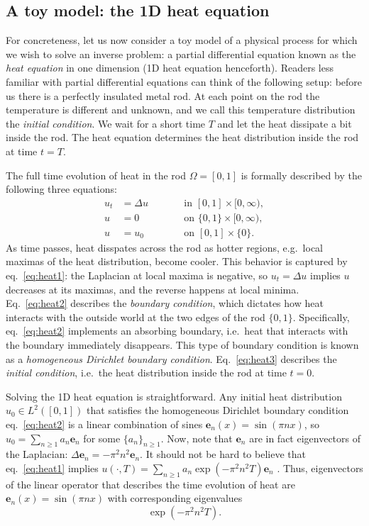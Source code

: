 \documentclass[ba]{imsart}
\newcommand{\ev}{\mathbf{e}} \newcommand{\func}{\mathbf{a}}
\theoremstyle{plain}
\theoremstyle{definition}
\theoremstyle{remark}
\begin{document}
\subsection{A toy model: the 1D heat equation}\label{subsec:toy}
For concreteness, let us now consider a toy model of a physical
process for which we wish to solve an inverse problem: a partial
differential equation known as the \emph{heat equation} in one
dimension (1D heat equation henceforth). Readers less familiar with
partial differential equations can think of the following setup:
before us there is a perfectly insulated metal rod. At each point on
the rod the temperature is different and unknown, and we call this
temperature distribution the \emph{initial condition}. We wait for a
short time $T$ and let the heat dissipate a bit inside the rod. The
heat equation determines the heat distribution inside the rod at time
$t=T$.

The full time evolution of heat in the rod $\Omega=[0,1]$ is formally
described by the following three equations:
\begin{subequations}\begin{alignat}{2}
    u_t &= \Delta u &&\qquad \text{in } [0,1] \times [0,\infty), \label{eq:heat1}\\
    u &= 0 &&\qquad \text{on } \{0, 1\} \times [0,\infty), \label{eq:heat2}\\
    u &= u_0 &&\qquad \text{on }[0,1] \times \{0\}. \label{eq:heat3}
  \end{alignat}
\end{subequations}
As time passes, heat disspates across the rod as hotter regions,
e.g.~local maximas of the heat distribution, become cooler. This
behavior is captured by eq.~\eqref{eq:heat1}: the Laplacian at local
maxima is negative, so $u_t = \Delta u$ implies $u$ decreases at its
maximas, and the reverse happens at local minima. Eq.~\eqref{eq:heat2}
describes the \emph{boundary condition}, which dictates how heat
interacts with the outside world at the two edges of the rod
$\{0,1\}$. Specifically, eq.~\eqref{eq:heat2} implements an absorbing
boundary, i.e.~heat that interacts with the boundary immediately
disappears. This type of boundary condition is known as a
\emph{homogeneous Dirichlet boundary condition}. Eq.~\eqref{eq:heat3}
describes the \emph{initial condition}, i.e.~the heat distribution
inside the rod at time $t=0$.

Solving the 1D heat equation is straightforward. Any initial heat
distribution $u_0\in L^2([0,1])$ that satisfies the homogeneous
Dirichlet boundary condition eq.~\eqref{eq:heat2} is a linear
combination of sines $\ev_n(x) = \sin(\pi n x)$, so $u_0 = \sum_{n\geq
  1} a_n \ev_n$ for some $\{a_n\}_{n\geq 1}$. Now, note that $\ev_n$
are in fact eigenvectors of the Laplacian: $\Delta \ev_n = -\pi^2
n^2\ev_n$. It should not be hard to believe that eq.~\eqref{eq:heat1}
implies $u(\cdot, T) = \sum_{n\geq 1} a_n \exp(-\pi^2 n^2T ) \ev_n$
\cite{renardy2006PDE}. Thus, eigenvectors of the linear operator that
describes the time evolution of heat are $\ev_n(x) = \sin(\pi n x)$
with corresponding eigenvalues
\begin{equation}\label{eq:decay}
  \exp(-\pi^2 n^2T ).
\end{equation}
\end{document}
